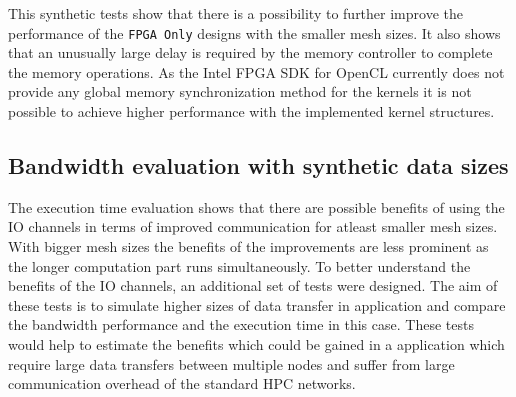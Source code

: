 This synthetic tests show that there is a possibility to further improve the performance of
the \texttt{FPGA Only} designs with the smaller mesh sizes. It also shows that an unusually
large delay is required by the memory controller to complete the memory operations. As the Intel FPGA SDK for OpenCL
currently does not provide any global memory synchronization method for the kernels it is not
possible to achieve higher performance with the implemented kernel structures.


\subsection{Bandwidth evaluation with synthetic data sizes}

The execution time evaluation shows that there are possible benefits of using the IO channels
in terms of improved communication for atleast smaller mesh sizes. With bigger mesh sizes
the benefits of the improvements are less prominent as the longer computation part runs
simultaneously. To better understand the benefits of the IO channels, an additional set of
tests were designed. The aim of these tests is to simulate higher sizes of data transfer
in application and compare the bandwidth performance and the execution time in this case.
These tests would help to estimate the benefits which could be gained in a application
which require large data transfers between multiple nodes and suffer from large
communication overhead of the standard HPC networks.

